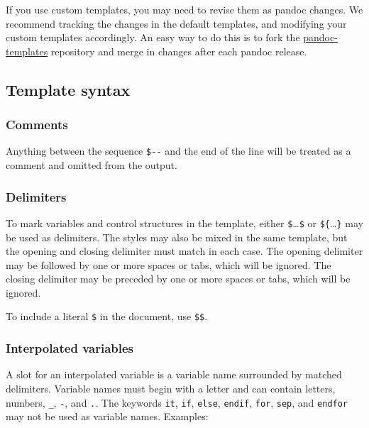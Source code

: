 \documentclass[
]{article}
\begin{document}
If you use custom templates, you may need to revise them as pandoc
changes. We recommend tracking the changes in the default templates, and
modifying your custom templates accordingly. An easy way to do this is
to fork the
\href{https://github.com/jgm/pandoc-templates}{pandoc-templates}
repository and merge in changes after each pandoc release.

\hypertarget{template-syntax}{%
\subsection{Template syntax}\label{template-syntax}}

\hypertarget{comments}{%
\subsubsection{Comments}\label{comments}}

Anything between the sequence \texttt{\$-\/-} and the end of the line
will be treated as a comment and omitted from the output.

\hypertarget{delimiters}{%
\subsubsection{Delimiters}\label{delimiters}}

To mark variables and control structures in the template, either
\texttt{\$}\ldots{}\texttt{\$} or \texttt{\$\{}\ldots{}\texttt{\}} may
be used as delimiters. The styles may also be mixed in the same
template, but the opening and closing delimiter must match in each case.
The opening delimiter may be followed by one or more spaces or tabs,
which will be ignored. The closing delimiter may be preceded by one or
more spaces or tabs, which will be ignored.

To include a literal \texttt{\$} in the document, use \texttt{\$\$}.

\hypertarget{interpolated-variables}{%
\subsubsection{Interpolated variables}\label{interpolated-variables}}

A slot for an interpolated variable is a variable name surrounded by
matched delimiters. Variable names must begin with a letter and can
contain letters, numbers, \texttt{\_}, \texttt{-}, and \texttt{.}. The
keywords \texttt{it}, \texttt{if}, \texttt{else}, \texttt{endif},
\texttt{for}, \texttt{sep}, and \texttt{endfor} may not be used as
variable names. Examples:
\end{document}
